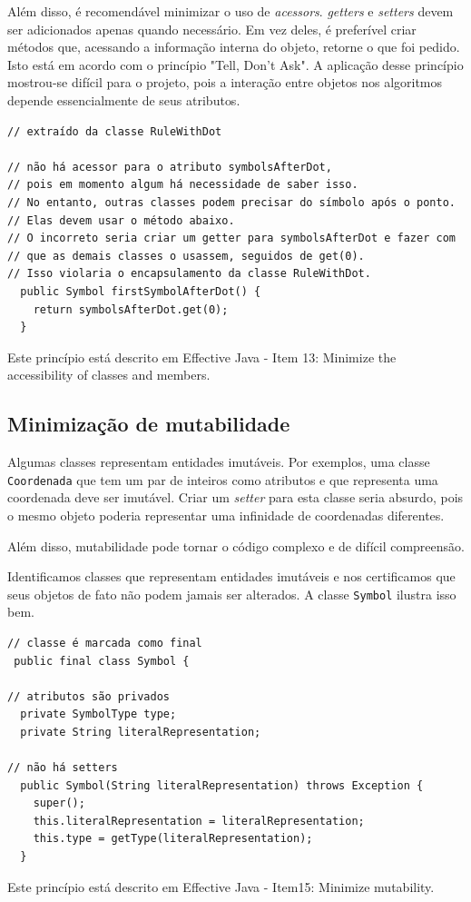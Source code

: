 \documentclass[11pt]{article}
\begin{document}
Além disso, é recomendável minimizar o uso de \emph{acessors}. \emph{getters} e \emph{setters}
devem ser adicionados apenas quando necessário. Em vez deles, é preferível criar
métodos que, acessando a informação interna do objeto, retorne o que foi pedido.
Isto está em acordo com o princípio "Tell, Don't Ask". A aplicação desse
princípio mostrou-se difícil para o projeto, pois a interação entre objetos nos
algoritmos depende essencialmente de seus atributos.

\begin{verbatim}
// extraído da classe RuleWithDot

// não há acessor para o atributo symbolsAfterDot,
// pois em momento algum há necessidade de saber isso.
// No entanto, outras classes podem precisar do símbolo após o ponto.
// Elas devem usar o método abaixo.
// O incorreto seria criar um getter para symbolsAfterDot e fazer com
// que as demais classes o usassem, seguidos de get(0).
// Isso violaria o encapsulamento da classe RuleWithDot.
  public Symbol firstSymbolAfterDot() {
    return symbolsAfterDot.get(0);
  }
\end{verbatim}

Este princípio está descrito em Effective Java - Item 13: Minimize the accessibility of classes and members.

\subsection{Minimização de mutabilidade}
\label{sec:orgheadline21}
Algumas classes representam entidades imutáveis. Por exemplos, uma classe \texttt{Coordenada}
que tem um par de inteiros como atributos e que representa uma coordenada deve
ser imutável. Criar um \emph{setter} para esta classe seria absurdo, pois o mesmo
objeto poderia representar uma infinidade de coordenadas diferentes.

Além disso, mutabilidade pode tornar o código complexo e de difícil compreensão.

Identificamos classes que representam entidades imutáveis e nos certificamos que
seus objetos de fato não podem jamais ser alterados. A classe \texttt{Symbol} ilustra
isso bem.

\begin{verbatim}
// classe é marcada como final
 public final class Symbol {

// atributos são privados
  private SymbolType type;
  private String literalRepresentation;

// não há setters
  public Symbol(String literalRepresentation) throws Exception {
    super();
    this.literalRepresentation = literalRepresentation;
    this.type = getType(literalRepresentation);
  }
\end{verbatim}
Este princípio está descrito em Effective Java - Item15: Minimize mutability.
\end{document}
